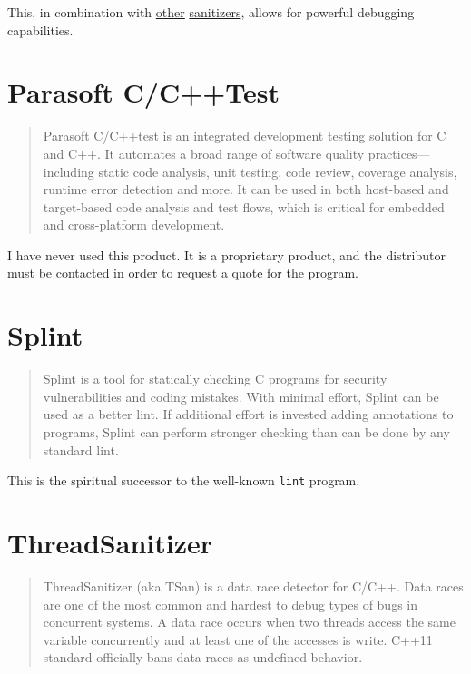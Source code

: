 \documentclass[12pt]{article}
\begin{document}
\label{msan}
This, in combination with \hyperref[asan]{other} \hyperref[tsan]{sanitizers},
allows for powerful debugging capabilities.
\cite{msan}
\section{Parasoft C/C++Test}

\begin{quote}
Parasoft C/C++test is an integrated development testing solution for C and
C++. It automates a broad range of software quality practices—including
static code analysis, unit testing, code review, coverage analysis,
runtime error detection and more. It can be used in both host-based
and target-based code analysis and test flows, which is critical for
embedded and cross-platform development.
\end{quote}

I have never used this product. It is a proprietary product, and the
distributor must be contacted in order to request a quote for the program.
\cite{cpptest}
\section{Splint}

\begin{quote}
Splint is a tool for statically checking C programs for security
vulnerabilities and coding mistakes. With minimal effort, Splint can
be used as a better lint. If additional effort is invested adding
annotations to programs, Splint can perform stronger checking than
can be done by any standard lint.
\end{quote}

This is the spiritual successor to the well-known \texttt{lint} program.
\cite{splint}
\section{ThreadSanitizer}

\begin{quote}
ThreadSanitizer (aka TSan) is a data race detector for C/C++. Data
races are one of the most common and hardest to debug types of bugs
in concurrent systems. A data race occurs when two threads access
the same variable concurrently and at least one of the accesses
is write. C++11 standard officially bans data races as undefined
behavior.
\end{quote}
\end{document}
